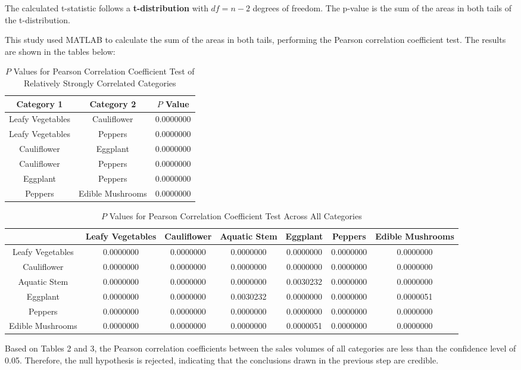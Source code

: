 \documentclass{article}
\begin{document}
	The calculated t-statistic follows a \textbf{t-distribution} with $\textit{df} = n - 2$ degrees of freedom. The p-value is the sum of the areas in both tails of the t-distribution.
	
	This study used MATLAB to calculate the sum of the areas in both tails, performing the Pearson correlation coefficient test. The results are shown in the tables below:
	
	\begin{table}[htbp]
		\centering
		\caption{$P$ Values for Pearson Correlation Coefficient Test of Relatively Strongly Correlated Categories}
		\label{tab:p_value_strong}
		\renewcommand{\arraystretch}{1.5}
		\renewcommand{\heavyrulewidth}{1.2pt}
		\begin{tabular}{ccc}
			\toprule
			Category 1 & Category 2 & $P$ Value \\
			\midrule
			Leafy Vegetables & Cauliflower & 0.0000000 \\
			Leafy Vegetables & Peppers & 0.0000000 \\
			Cauliflower & Eggplant & 0.0000000 \\
			Cauliflower & Peppers & 0.0000000 \\
			Eggplant & Peppers & 0.0000000 \\
			Peppers & Edible Mushrooms & 0.0000000 \\
			\bottomrule
		\end{tabular}
		\renewcommand{\heavyrulewidth}{0.8pt}
	\end{table}
	
	\begin{table}[htbp]
		\centering
		\caption{$P$ Values for Pearson Correlation Coefficient Test Across All Categories}
		\label{tab:p_value_all}
		\renewcommand{\arraystretch}{1.5}
		\renewcommand{\heavyrulewidth}{1.2pt}
		\begin{tabular}{ccccccc}
			\toprule
			& Leafy Vegetables & Cauliflower & Aquatic Stem & Eggplant & Peppers & Edible Mushrooms \\
			\midrule
			Leafy Vegetables & 0.0000000 & 0.0000000 & 0.0000000 & 0.0000000 & 0.0000000 & 0.0000000 \\
			Cauliflower & 0.0000000 & 0.0000000 & 0.0000000 & 0.0000000 & 0.0000000 & 0.0000000 \\
			Aquatic Stem & 0.0000000 & 0.0000000 & 0.0000000 & 0.0030232 & 0.0000000 & 0.0000000 \\
			Eggplant & 0.0000000 & 0.0000000 & 0.0030232 & 0.0000000 & 0.0000000 & 0.0000051 \\
			Peppers & 0.0000000 & 0.0000000 & 0.0000000 & 0.0000000 & 0.0000000 & 0.0000000 \\
			Edible Mushrooms & 0.0000000 & 0.0000000 & 0.0000000 & 0.0000051 & 0.0000000 & 0.0000000 \\
			\bottomrule
		\end{tabular}
		\renewcommand{\heavyrulewidth}{0.8pt}
	\end{table}
	
	Based on Tables 2 and 3, the Pearson correlation coefficients between the sales volumes of all categories are less than the confidence level of 0.05. Therefore, the null hypothesis is rejected, indicating that the conclusions drawn in the previous step are credible.
\end{document}
